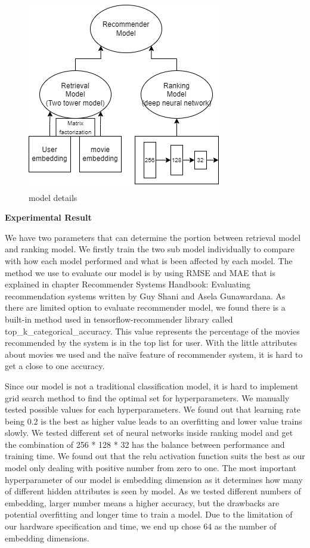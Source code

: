 \documentclass[11pt]{article}
\begin{document}
\begin{figure}[H]
    \centering
    \includegraphics[width=.5\textwidth]{image/model_details.png}
    \caption{model details}
  \end{figure}

\vspace{0.5cm}

    \begin{flushleft}
        \textbf{\LARGE Experimental Result}
    \end{flushleft}

We have two parameters that can determine the portion between retrieval model and ranking model. We firstly train the two sub model individually to compare with how each model performed and what is been affected by each model. The method we use to evaluate our model is by using RMSE and MAE that is explained in chapter Recommender Systems Handbook: Evaluating recommendation systems written by Guy Shani and Asela Gunawardana. As there are limited option to evaluate recommender model, we found there is a built-in method used in tensorflow-recommender library called top\_k\_categorical\_accuracy. This value represents the percentage of the movies recommended by the system is in the top list for user. With the little attributes about movies we used and the naïve feature of recommender system, it is hard to get a close to one accuracy.

\vspace{0.3cm}

Since our model is not a traditional classification model, it is hard to implement grid search method to find the optimal set for hyperparameters. We manually tested possible values for each hyperparameters. We found out that learning rate being 0.2 is the best as higher value leads to an overfitting and lower value trains slowly. We tested different set of neural networks inside ranking model and get the combination of 256 * 128 * 32 has the balance between performance and training time. We found out that the relu activation function suits the best as our model only dealing with positive number from zero to one. The most important hyperparameter of our model is embedding dimension as it determines how many of different hidden attributes is seen by model. As we tested different numbers of embedding, larger number means a higher accuracy, but the drawbacks are potential overfitting and longer time to train a model. Due to the limitation of our hardware specification and time, we end up chose 64 as the number of embedding dimensions.
\end{document}

